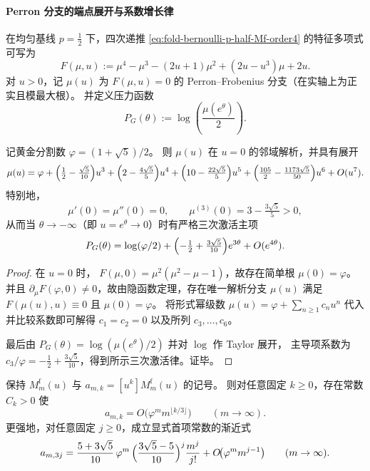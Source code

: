 \paragraph{Perron 分支的端点展开与系数增长律}
在均匀基线 \(p=\tfrac12\) 下，四次递推 \eqref{eq:fold-bernoulli-p-half-Mf-order4} 的特征多项式可写为
\begin{equation}\label{eq:fold-bernoulli-half-perron-quartic}
F(\mu,u):=\mu^{4}-\mu^{3}-(2u+1)\mu^{2}+(2u-u^{3})\mu+2u.
\end{equation}
对 \(u>0\)，记 \(\mu(u)\) 为 \(F(\mu,u)=0\) 的 Perron--Frobenius 分支（在实轴上为正实且模最大根）。
并定义压力函数
\[
P_G(\theta):=\log\!\left(\frac{\mu(e^\theta)}{2}\right).
\]

\begin{theorem}[低温三次激活律：主导谱支在 \texorpdfstring{$u=0$}{u=0} 的前三阶消失]\label{thm:fold-bernoulli-half-low-temp-cubic-activation}
记黄金分割数 \(\varphi=(1+\sqrt5)/2\)。
则 \(\mu(u)\) 在 \(u=0\) 的邻域解析，并具有展开
\[
\mu(u)=\varphi+\Bigl(\tfrac12-\tfrac{\sqrt5}{10}\Bigr)u^3+\Bigl(2-\tfrac{4\sqrt5}{5}\Bigr)u^4+\Bigl(10-\tfrac{22\sqrt5}{5}\Bigr)u^5+\Bigl(\tfrac{105}{2}-\tfrac{1173\sqrt5}{50}\Bigr)u^6+O(u^7).
\]
特别地，
\[
\mu'(0)=\mu''(0)=0,\qquad \mu^{(3)}(0)=3-\tfrac{3\sqrt5}{5}>0,
\]
从而当 \(\theta\to-\infty\)（即 \(u=e^\theta\to0\)）时有严格三次激活主项
\[
P_G(\theta)=\log(\varphi/2)+\Bigl(-\tfrac12+\tfrac{3\sqrt5}{10}\Bigr)e^{3\theta}+O(e^{4\theta}).
\]
\end{theorem}

\begin{proof}
在 \(u=0\) 时，
\(
F(\mu,0)=\mu^2(\mu^2-\mu-1)
\)，故存在简单根 \(\mu(0)=\varphi\)。
并且
\(
\partial_\mu F(\varphi,0)\neq 0
\)，故由隐函数定理，存在唯一解析分支 \(\mu(u)\) 满足 \(F(\mu(u),u)\equiv 0\) 且 \(\mu(0)=\varphi\)。
将形式幂级数 \(\mu(u)=\varphi+\sum_{n\ge 1}c_nu^n\) 代入并比较系数即可解得 \(c_1=c_2=0\) 以及所列 \(c_3,\dots,c_6\)。
\par
最后由 \(P_G(\theta)=\log(\mu(e^\theta)/2)\) 并对 \(\log\) 作 Taylor 展开，
主导项系数为 \(c_3/\varphi=-\tfrac12+\tfrac{3\sqrt5}{10}\)，得到所示三次激活律。证毕。
\end{proof}

\begin{corollary}\label{cor:fold-bernoulli-half-fixed-defect-growth}
保持 \(M_m^{\mathrm f}(u)\) 与 \(a_{m,k}=[u^k]M_m^{\mathrm f}(u)\) 的记号。
则对任意固定 \(k\ge 0\)，存在常数 \(C_k>0\) 使
\[
a_{m,k}=O\!\bigl(\varphi^m m^{\lfloor k/3\rfloor}\bigr)\qquad(m\to\infty).
\]
更强地，对任意固定 \(j\ge 0\)，成立显式首项常数的渐近式
\[
a_{m,3j}
=\frac{5+3\sqrt5}{10}\,\varphi^m\,
\Bigl(\frac{3\sqrt5-5}{10}\Bigr)^{j}\frac{m^{j}}{j!}
+O\!\bigl(\varphi^m m^{j-1}\bigr)\qquad(m\to\infty).
\]
\end{corollary}


